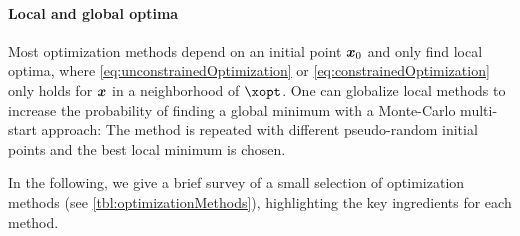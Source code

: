 \paragraph{Local and global optima}

Most optimization methods depend on an initial point ${\boldsymbol{x}}_0$ and
only find local optima,
where \eqref{eq:unconstrainedOptimization} or
\eqref{eq:constrainedOptimization} only holds for ${\boldsymbol{x}}$
in a neighborhood of $\xopt$.
One can globalize local methods to increase the probability
of finding a global minimum with a Monte-Carlo multi-start approach:
The method is repeated with different pseudo-random initial points
and the best local minimum is chosen.

In the following,
we give a brief survey of a small selection of optimization methods
(see \cref{tbl:optimizationMethods}),
highlighting the key ingredients for each method.

